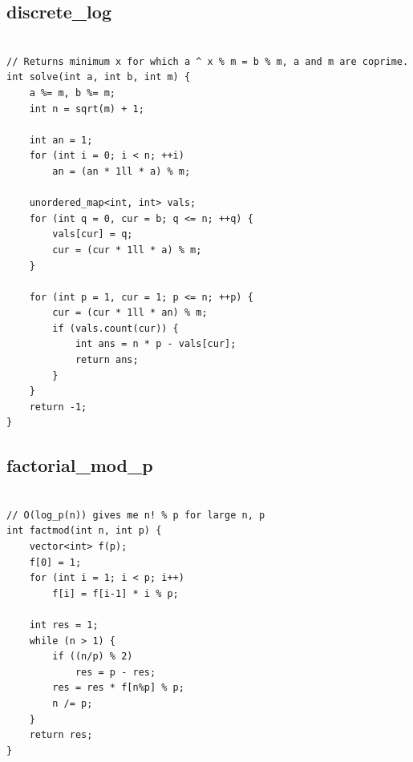 \documentclass[9pt, landscape, a4paper,twosided]{extarticle}
\begin{document}
\begin{multicols*}{3}
\subsection{discrete\_log}
\begin{verbatim}

// Returns minimum x for which a ^ x % m = b % m, a and m are coprime.
int solve(int a, int b, int m) {
    a %= m, b %= m;
    int n = sqrt(m) + 1;

    int an = 1;
    for (int i = 0; i < n; ++i)
        an = (an * 1ll * a) % m;

    unordered_map<int, int> vals;
    for (int q = 0, cur = b; q <= n; ++q) {
        vals[cur] = q;
        cur = (cur * 1ll * a) % m;
    }

    for (int p = 1, cur = 1; p <= n; ++p) {
        cur = (cur * 1ll * an) % m;
        if (vals.count(cur)) {
            int ans = n * p - vals[cur];
            return ans;
        }
    }
    return -1;
}
\end{verbatim}

\subsection{factorial\_mod\_p}
\begin{verbatim}

// O(log_p(n)) gives me n! % p for large n, p
int factmod(int n, int p) {
    vector<int> f(p);
    f[0] = 1;
    for (int i = 1; i < p; i++)
        f[i] = f[i-1] * i % p;

    int res = 1;
    while (n > 1) {
        if ((n/p) % 2)
            res = p - res;
        res = res * f[n%p] % p;
        n /= p;
    }
    return res;
}
\end{verbatim}


\end{multicols*}
\end{document}
